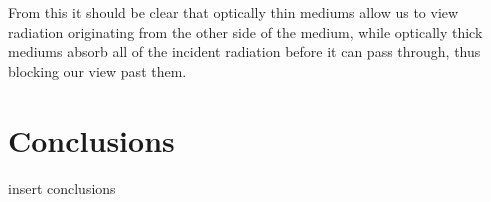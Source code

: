 \documentclass{aa}   %
\begin{document}
From this it should be clear that optically thin mediums allow us to view radiation originating from the other side of the medium, while optically thick mediums absorb all of the incident radiation before it can pass through, thus blocking our view past them.

\section{Conclusions} \label{sec:conclusions}
insert conclusions
\begin{acknowledgements}
\end{acknowledgements}

\end{document}
